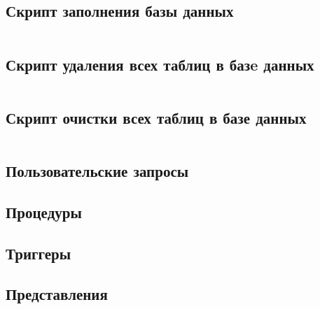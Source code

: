 \documentclass[12 pt, a4paper]{article}
\begin{document}
\subsection{Скрипт заполнения базы данных}
\inputminted{sql}{../fill_db.sql}
\subsection{Скрипт удаления всех таблиц в базe данных}
\inputminted{sql}{../drop_db.sql}
\subsection{Скрипт очистки всех таблиц в базе данных}
\inputminted{sql}{../clear_db.sql}
\subsection{Пользовательские запросы}
\subsection{Процедуры}
\subsection{Триггеры}
\subsection{Представления}
\end{document}
